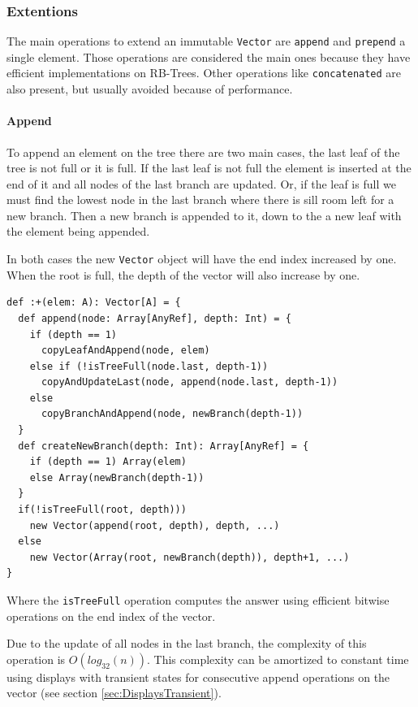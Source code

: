 
\subsubsection{Extentions}
The main operations to extend an immutable \texttt{Vector} are \texttt{append} and \texttt{prepend} a single element. Those operations are considered the main ones because they have efficient implementations on RB-Trees. Other operations like \texttt{concatenated} are also present, but usually avoided because of performance.


\paragraph{Append}
To append an element on the tree there are two main cases, the last leaf of the tree is not full or it is full. If the last leaf is not full the element is inserted at the end of it and all nodes of the last branch are updated. Or, if the leaf is full we must find the lowest node in the last branch where there is sill room left for a new branch. Then a new branch is appended to it, down to the a new leaf with the element being appended. 

In both cases the new \texttt{Vector} object will have the end index increased by one. When the root is full, the depth of the vector will also increase by one.

\begin{lstlisting}[frame=single]
def :+(elem: A): Vector[A] = {
  def append(node: Array[AnyRef], depth: Int) = {
    if (depth == 1) 
      copyLeafAndAppend(node, elem)
    else if (!isTreeFull(node.last, depth-1)) 
      copyAndUpdateLast(node, append(node.last, depth-1))
    else
      copyBranchAndAppend(node, newBranch(depth-1))
  }
  def createNewBranch(depth: Int): Array[AnyRef] = {
    if (depth == 1) Array(elem)
    else Array(newBranch(depth-1))
  }
  if(!isTreeFull(root, depth))) 
    new Vector(append(root, depth), depth, ...)
  else 
    new Vector(Array(root, newBranch(depth)), depth+1, ...)
}
\end{lstlisting}

Where the \texttt{isTreeFull} operation computes the answer using efficient bitwise operations on the end index of the vector.

Due to the update of all nodes in the last branch, the complexity of this operation is $O(log_{32}(n))$. This complexity can be amortized to constant time using displays with transient states for consecutive append operations on the vector (see section \ref{sec:DisplaysTransient}).

